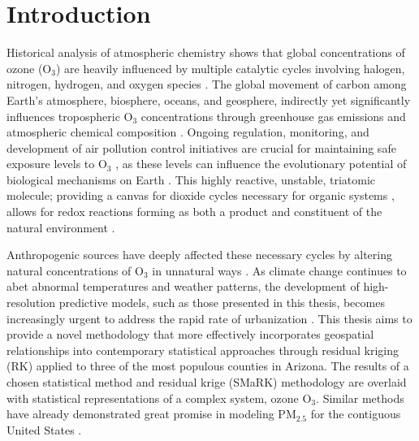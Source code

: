 \chapter{Introduction} \label{chap:introchap} Historical analysis of atmospheric chemistry shows that global concentrations of ozone (O$_3$) are heavily influenced by multiple catalytic cycles involving halogen, nitrogen, hydrogen, and oxygen species \parencite{caffrey_cloud_2001, dobson_measurements_1923, he_sensitivity_1999}. The global movement of carbon among Earth’s atmosphere, biosphere, oceans, and geosphere, indirectly yet significantly influences tropospheric O$_3$ concentrations through greenhouse gas emissions and atmospheric chemical composition \parencite{danyang_ma_effect_2023,hata_impact_2023,liu_carbonyl_2022}. Ongoing regulation, monitoring, and development of air pollution control initiatives are crucial for maintaining safe exposure levels to O$_3$ \parencite{branis_long_2008,manes_regulating_2016,american_lung_association_disparities_2023,epa_benefits_2015}, as these levels can influence the evolutionary potential of biological mechanisms on Earth \parencite{grenfell_co-evolution_2010,kasting_life_2002}. This highly reactive, unstable, triatomic molecule; providing a canvas for dioxide cycles necessary for organic systems \parencite{caffrey_cloud_2001,lyons_rise_2014}, allows for redox reactions forming as both a product and constituent of the natural environment \parencite{chapleski_heterogeneous_2016,xing_representing_2016,zoran_ground_2014}. 

Anthropogenic sources have deeply affected these necessary cycles by altering natural concentrations of O$_3$ in unnatural ways \parencite{chauhan_rising_2023,cheadle_surface_2017,danyang_ma_effect_2023,flynn_relationship_2014}. As climate change continues to abet abnormal temperatures and weather patterns, the development of high-resolution predictive models, such as those presented in this thesis, becomes increasingly urgent to address the rapid rate of urbanization \parencite{balk_understanding_2018,epa_climate_2021,iglesias_risky_2021}. This thesis aims to provide a novel methodology that more effectively incorporates geospatial relationships into contemporary statistical approaches through residual kriging (RK) applied to three of the most populous counties in Arizona. The results of a chosen statistical method and residual krige (SMaRK) methodology are overlaid with statistical representations of a complex system, ozone O$_3$. Similar methods have already demonstrated great promise in modeling PM$_2.5$ for the contiguous United States \parencite{liu_improve_2018}. 
